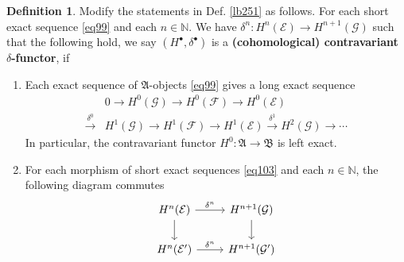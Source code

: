 \documentclass[12pt,b5paper,notitlepage]{report}
\theoremstyle{definition}
\newtheorem{df}{Definition}[section]
\theoremstyle{plain}
\newcommand{\fk}{\mathfrak}
\newcommand{\mc}{\mathcal}
\newcommand{\blt}{\bullet}
\newcommand{\Nbb}{\mathbb N}
\numberwithin{equation}{section}
\begin{document}
\begin{df}
Modify the statements in Def. \ref{lb251} as follows. For each short exact sequence \eqref{eq99} and each $n\in\Nbb$. We have $\delta^n:H^n(\mc E)\rightarrow H^{n+1}(\mc G)$ such that the following hold, we say $(H^\blt,\delta^\blt)$ is a \textbf{(cohomological) contravariant $\delta$-functor}, if
\begin{enumerate}[label=(\arabic*)]
\item Each exact sequence of $\fk A$-objects \eqref{eq99} gives a long exact sequence 
\begin{align*}
&0\rightarrow H^0(\mc G)\rightarrow H^0(\mc F)\rightarrow H^0(\mc E)\\
\xrightarrow{\delta^0}& H^1(\mc G)\rightarrow H^1(\mc F)\rightarrow H^1(\mc E)\xrightarrow{\delta^1} H^2(\mc G)\rightarrow \cdots
\end{align*}
In particular, the contravariant functor $H^0:\fk A\rightarrow\fk B$ is left exact.
\item For each morphism of short exact sequences \eqref{eq103} and each $n\in\Nbb$, the following diagram commutes
\begin{equation*}
\begin{tikzcd}
H^n(\mc E) \arrow[r,"\delta^n"] \arrow[d] & H^{n+1}(\mc G) \arrow[d] \\
H^n(\mc E') \arrow[r,"\delta^n"]           & H^{n+1}(\mc G')          
\end{tikzcd}
\end{equation*}
\end{enumerate}
\end{df}
\end{document}

